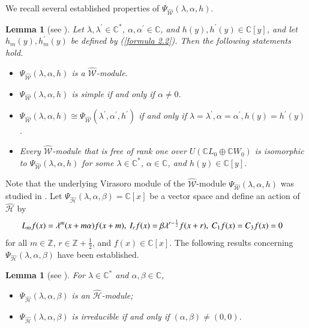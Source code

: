 \documentclass[12pt,reqno]{amsart}
\def\Z{\mathbb{Z}}
\def\C{\mathbb{C}}
\numberwithin{equation}{section}
\newtheorem{lemm}[theo]{Lemma}
\begin{document}
We recall several established properties of $\Psi_{\hat{\mathcal{W}}}(\lambda,\alpha,h)$.
\begin{lemm}[\rm see \cite{CG}]\label{le2.1}
Let $\lambda,\lambda^{\prime}\in\mathbb C^*$, $\alpha,\alpha^{\prime}\in\mathbb C$, and $h(y),h^{\prime}(y)\in\mathbb C[y]$, and let $h_m(y),h^{\prime}_m(y)$ be defined by (\ref{formula 2.2}). Then the following statements hold.
\begin{itemize}
\item[\rm(1)] $\Psi_{\hat{\mathcal{W}}}(\lambda,\alpha,h)$ is a $\hat{\mathcal{W}}$-module.
\item[\rm(2)] $\Psi_{\hat{\mathcal{W}}}(\lambda,\alpha,h)$ is simple if and only if $\alpha\neq0$.
\item[\rm(3)] $\Psi_{\hat{\mathcal{W}}}(\lambda,\alpha,h)\cong \Psi_{\hat{\mathcal{W}}}(\lambda^{\prime},\alpha^{\prime},h^{\prime})$ if and only if $\lambda=\lambda^{\prime},\alpha=\alpha^{\prime},h(y)=h^{\prime}(y)$.
\item[\rm(4)] 
Every $\hat{\mathcal{W}}$-module that is free of rank one over $U(\mathbb C L_0\oplus\mathbb C W_0)$ is isomorphic to $\Psi_{\hat{\mathcal{W}}}(\lambda,\alpha,h)$ for some $\lambda\in\mathbb C^*$, $\alpha\in\mathbb C$, and $h(y)\in\mathbb C[y]$.
\end{itemize}
\end{lemm}
Note that the underlying Virasoro module of the $\hat{\mathcal{W}}$-module $\Psi_{\hat{\mathcal{W}}}(\lambda,\alpha,h)$ was studied in \cite{CG2}.
Let $\Psi_{\hat{\mathcal{H}}}(\lambda,\alpha,\beta)=\C[x]$
be a vector space and define an action of $\hat{\mathcal{H}}$ by
\begin{equation*}
\aligned
L_mf(x)&=\lambda^m(x+m\alpha)f(x+m),\ 
I_rf(x)=\beta\lambda^{r-\frac{1}{2}}f(x+r),\
C_1 f(x)= C_3 f(x) =0
\endaligned
\end{equation*}
for all $m\in\Z$, $r\in\Z+\frac{1}{2}$, and $f(x)\in\C[x]$. The following results concerning $\Psi_{\hat{\mathcal{H}}}(\lambda,\alpha,\beta)$ have been established.

\begin{lemm}[\rm see \cite{GMZ}]\label{le2.1.1}
For $\lambda\in\C^*$ and $\alpha,\beta\in\C$,
\begin{itemize}
\item[\rm(1)] $\Psi_{\hat{\mathcal{H}}}(\lambda,\alpha,\beta)$ is an $\hat{\mathcal{H}}$-module;
\item[\rm(2)] $\Psi_{\hat{\mathcal{H}}}(\lambda,\alpha,\beta)$ is irreducible if and only if $(\alpha, \beta)\neq(0,0)$.
\end{itemize}
\end{lemm}
\end{document}
